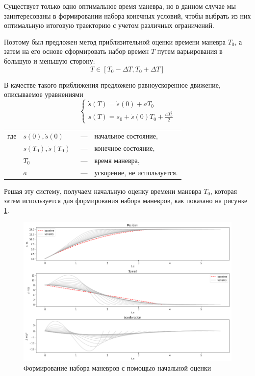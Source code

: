 Существует только одно оптимальное время маневра, но в данном случае мы заинтересованы в формировании
набора конечных условий, чтобы выбрать из них оптимальную итоговую траекторию с учетом различных ограничений.

Поэтому был предложен метод приблизительной оценки времени маневра $T_0$, а затем на его основе сформировать
набор времен $T$ путем варьирования в большую и меньшую сторону:
\begin{equation}
    T \in [T_0 - \Delta T, T_0 + \Delta T]
\end{equation}

В качестве такого приближения предложено равноускоренное движение, описываемое уравнениями
\begin{equation}
    \begin{cases}
    \dot{s}(T) = \dot{s}(0) + aT_0 \\
    s(T) = s_0 + \dot{s}(0)T_0 + \frac{aT_0^2}{2}
    \end{cases}
\end{equation}
\noindent\begin{tabularx}{\linewidth}{lllX}
    где & $s(0), \dot{s}(0)$         &~---& начальное состояние, \\
        & $s(T_0), \dot{s}(T_0)$     &~---& конечное состояние, \\
        & $T_0$                      &~---& время маневра, \\
       & $a$                         &~---& ускорение, не используется.
\end{tabularx}

Решая эту систему, получаем начальную оценку времени маневра $T_0$, которая затем используется для
формирования набора маневров, как показано на рисунке \ref{img:t_choose_baseline}.

\begin{figure}[h]
    \centering
    \includegraphics[width=1\textwidth]{images/t_choose_baseline}
    \caption{Формирование набора маневров с помощью начальной оценки}
    \label{img:t_choose_baseline}
\end{figure}

